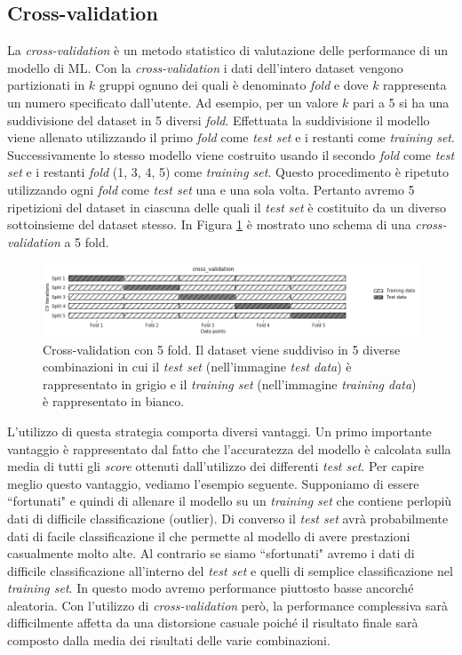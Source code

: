 \documentclass[12pt,italian]{report}
\begin{document}
\subsection{Cross-validation}
La \emph{cross-validation} è un metodo statistico di valutazione delle performance di un modello di ML. Con la \emph{cross-validation} i dati dell'intero dataset vengono partizionati in $k$ gruppi ognuno dei quali è denominato \emph{fold} e dove $k$ rappresenta un numero specificato dall'utente. Ad esempio, per un valore $k$ pari a 5 si ha una suddivisione del dataset in 5 diversi \emph{fold}. Effettuata la suddivisione il modello viene allenato utilizzando il primo \emph{fold} come \emph{test set} e i restanti come \emph{training set}. Successivamente lo stesso modello viene costruito usando il secondo \emph{fold} come \emph{test set} e i restanti \emph{fold} (1, 3, 4, 5) come \emph{training set}. Questo procedimento è ripetuto utilizzando ogni \emph{fold} come \emph{test set} una e una sola volta. Pertanto avremo 5 ripetizioni del dataset in ciascuna delle quali il \emph{test set} è costituito da un diverso sottoinsieme del dataset stesso.
In Figura \ref{fig:cv} è mostrato uno schema di una \emph{cross-validation} a 5 fold.

\begin{figure}[h!]
	\center
	\includegraphics[scale=0.5]{../img/cv} %
	\caption{Cross-validation con 5 fold. Il dataset viene suddiviso in 5 diverse combinazioni in cui il \emph{test set} (nell'immagine \emph{test data}) è rappresentato in grigio e il \emph{training set} (nell'immagine \emph{training data}) è rappresentato in bianco.}
	\label{fig:cv}
\end{figure}

L'utilizzo di questa strategia comporta diversi vantaggi. Un primo importante vantaggio è rappresentato dal fatto che l'accuratezza del modello è calcolata sulla media di tutti gli \emph{score} ottenuti dall'utilizzo dei differenti \emph{test set}. Per capire meglio questo vantaggio, vediamo l'esempio seguente. Supponiamo di essere ``fortunati" e quindi di allenare il modello su un \emph{training set} che contiene perlopiù dati di difficile classificazione (outlier). Di converso il \emph{test set} avrà probabilmente dati di facile classificazione il che permette al modello di avere prestazioni casualmente molto alte. Al contrario se siamo ``sfortunati" avremo i dati di difficile classificazione all'interno del \emph{test set} e quelli di semplice classificazione nel \emph{training set}. In questo modo avremo performance piuttosto basse ancorché aleatoria.
Con l'utilizzo di \emph{cross-validation} però, la performance complessiva sarà difficilmente affetta da una distorsione casuale poiché il risultato finale sarà composto dalla media dei risultati delle varie combinazioni.
\end{document}
